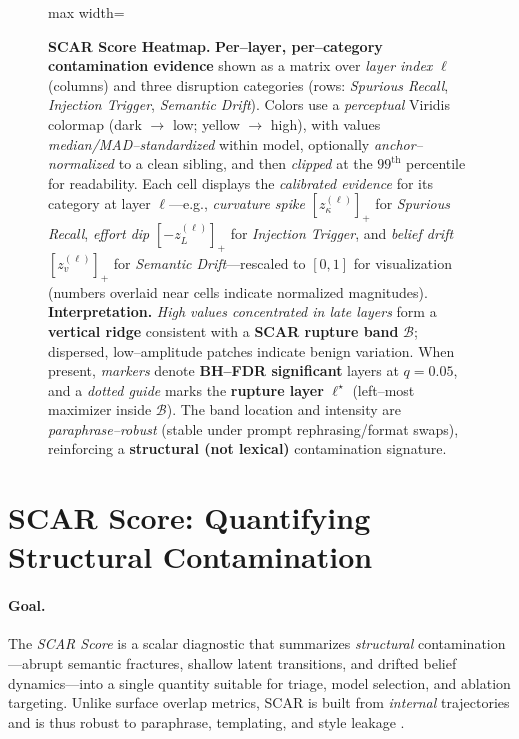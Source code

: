 \documentclass[11pt]{article}
\begin{document}
\begin{figure}[ht]
\begin{adjustbox}{max width=\textwidth}
\end{adjustbox}
\caption{\textbf{SCAR Score Heatmap.}
\textbf{Per–layer, per–category contamination evidence} shown as a matrix over \emph{layer index} $\ell$ (columns) and three disruption categories (rows: \emph{Spurious Recall}, \emph{Injection Trigger}, \emph{Semantic Drift}). Colors use a \emph{perceptual} Viridis colormap (dark $\rightarrow$ low; yellow $\rightarrow$ high), with values \emph{median/MAD–standardized} within model, optionally \emph{anchor–normalized} to a clean sibling, and then \emph{clipped} at the $99^{\mathrm{th}}$ percentile for readability. Each cell displays the \emph{calibrated evidence} for its category at layer $\ell$—e.g., \emph{curvature spike} $[z_{\kappa}^{(\ell)}]_+$ for \textit{Spurious Recall}, \emph{effort dip} $[-z_{L}^{(\ell)}]_+$ for \textit{Injection Trigger}, and \emph{belief drift} $[z_{v}^{(\ell)}]_+$ for \textit{Semantic Drift}—rescaled to $[0,1]$ for visualization (numbers overlaid near cells indicate normalized magnitudes). \textbf{Interpretation.} \emph{High values concentrated in late layers} form a \textbf{vertical ridge} consistent with a \textbf{SCAR rupture band} $\mathcal{B}$; dispersed, low–amplitude patches indicate benign variation. When present, \emph{markers} denote \textbf{BH–FDR significant} layers at $q{=}0.05$, and a \emph{dotted guide} marks the \textbf{rupture layer} $\ell^\star$ (left–most maximizer inside $\mathcal{B}$). The band location and intensity are \emph{paraphrase–robust} (stable under prompt rephrasing/format swaps), reinforcing a \textbf{structural (not lexical)} contamination signature.}
\label{fig:scar-heatmap}
\end{figure}






\section{SCAR Score: Quantifying Structural Contamination}
\label{sec:scar-score}

\paragraph{Goal.}
The \emph{SCAR Score} is a scalar diagnostic that summarizes \emph{structural} contamination—abrupt semantic fractures, shallow latent transitions, and drifted belief dynamics—into a single quantity suitable for triage, model selection, and ablation targeting. Unlike surface overlap metrics, SCAR is built from \emph{internal} trajectories and is thus robust to paraphrase, templating, and style leakage \citep{ribeiro2020checklist,iyyer2018scpn,dodge2021documenting,sainz2023need,deng2024investigating}.
\end{document}
